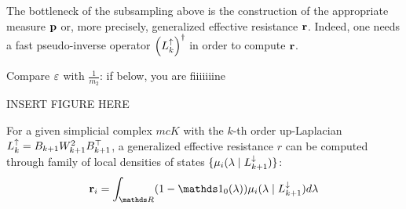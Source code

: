 \documentclass{mynotes}
\begin{document}
The bottleneck of the subsampling above is the construction of the appropriate measure \( \mathbf{p} \) or, more precisely, generalized effective resistance \( \mathbf{r} \). Indeed, one needs a fast pseudo-inverse operator \( \left(  L_{k}^{\uparrow} \right)^\dagger \) in order to compute \( \mathbf{r} \).

\begin{remark}
      Compare \( \varepsilon \) with \( \frac{1}{m_2}\): if below, you are fiiiiiiine

      INSERT FIGURE HERE
\end{remark}


\begin{thm}
      For a given simplicial complex \( mc K \) with the \(k\)-th order up-Laplacian \( L_{k}^{\uparrow} = B_{k+1} W_{k+1}^2 B_{k+1}^\top\), a generalized effective resistance \( r \) can be computed through family of local densities of states \( \{ \mu_i(\lambda \mid L_{k+1 }^{\downarrow}) \} \):
      \begin{equation}
            \b r_i = \int_{\ds R } (1 - \ds 1_0(\lambda)) \mu_i ( \lambda \mid \Ld {k+1} ) d\lambda 
      \end{equation}
\end{thm}
\end{document}
